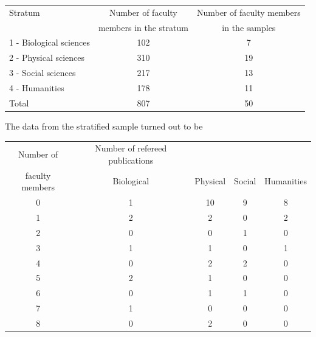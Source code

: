 \documentclass[12pt]{article}
\begin{document}
\begin{center}
\begin{tabular}{lcc}
Stratum & Number of faculty & Number of faculty members\\
& members in the stratum & in the samples\\
\hline
1 - Biological sciences & 102 & 7\\
2 - Physical sciences & 310 & 19\\
3 - Social sciences & 217 & 13\\
4 - Humanities & 178 & 11\\
\hline
Total & 807 & 50\\
\end{tabular}
\end{center}

The data from the stratified sample turned out to be
\begin{center}
\begin{tabular}{c|cccc}
Number of & Number of refereed publications \\
faculty members & Biological & Physical & Social & Humanities\\
\hline
0&	1	&10	&9	&8\\
1&	2	&2	&0	&2\\
2&	0	&0	&1	&0\\
3&	1	&1	&0	&1\\
4&	0	&2	&2	&0\\
5&	2	&1	&0	&0\\
6&	0	&1	&1	&0\\
7&	1	&0	&0	&0\\
8&	0	&2	&0	&0\\

\end{tabular}
\end{center}
\end{document}
